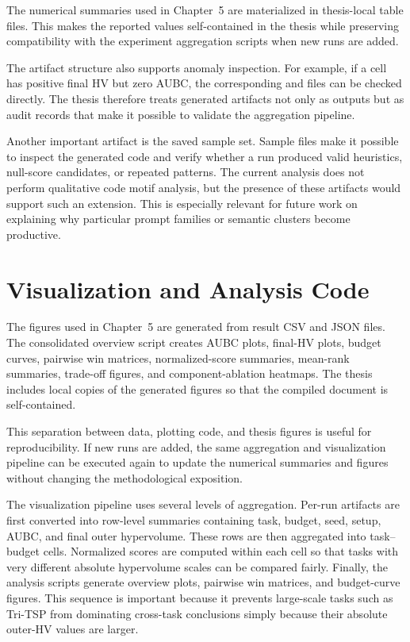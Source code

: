 The numerical summaries used in Chapter~5 are materialized in thesis-local table files. This makes the reported values self-contained in the thesis while preserving compatibility with the experiment aggregation scripts when new runs are added.

The artifact structure also supports anomaly inspection. For example, if a cell has positive final HV but zero AUBC, the corresponding  and  files can be checked directly. The thesis therefore treats generated artifacts not only as outputs but as audit records that make it possible to validate the aggregation pipeline.

Another important artifact is the saved sample set. Sample files make it possible to inspect the generated code and verify whether a run produced valid heuristics, null-score candidates, or repeated patterns. The current analysis does not perform qualitative code motif analysis, but the presence of these artifacts would support such an extension. This is especially relevant for future work on explaining why particular prompt families or semantic clusters become productive.

\section{Visualization and Analysis Code}

The figures used in Chapter~5 are generated from result CSV and JSON files. The consolidated overview script creates AUBC plots, final-HV plots, budget curves, pairwise win matrices, normalized-score summaries, mean-rank summaries, trade-off figures, and component-ablation heatmaps. The thesis includes local copies of the generated figures so that the compiled document is self-contained.

This separation between data, plotting code, and thesis figures is useful for reproducibility. If new runs are added, the same aggregation and visualization pipeline can be executed again to update the numerical summaries and figures without changing the methodological exposition.

The visualization pipeline uses several levels of aggregation. Per-run artifacts are first converted into row-level summaries containing task, budget, seed, setup, AUBC, and final outer hypervolume. These rows are then aggregated into task--budget cells. Normalized scores are computed within each cell so that tasks with very different absolute hypervolume scales can be compared fairly. Finally, the analysis scripts generate overview plots, pairwise win matrices, and budget-curve figures. This sequence is important because it prevents large-scale tasks such as Tri-TSP from dominating cross-task conclusions simply because their absolute outer-HV values are larger.

